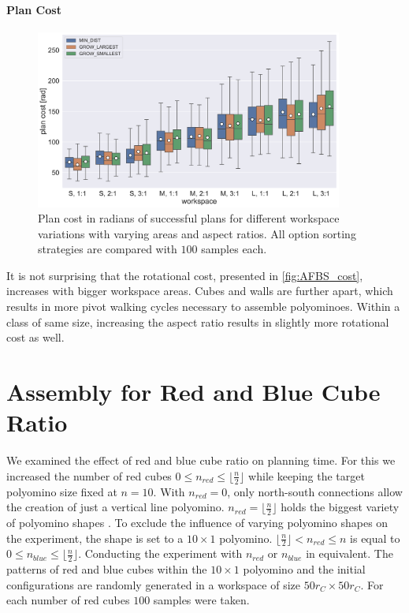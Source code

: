 \paragraph{Plan Cost} 

\begin{figure}
	\centering
	\includegraphics[width=0.9\textwidth]{figures/plots/AFBS_cost.pdf}
	\caption[Plan cost for different workspace variations]{Plan cost in radians of successful plans for different workspace variations with varying areas and aspect ratios. All option sorting strategies are compared with $100$ samples each.}
	\label{fig:AFBS_cost}
\end{figure}

It is not surprising that the rotational cost, presented in \autoref{fig:AFBS_cost}, increases with bigger workspace areas.
Cubes and walls are further apart, which results in more pivot walking cycles necessary to assemble polyominoes.
Within a class of same size, increasing the aspect ratio results in slightly more rotational cost as well.



\section{Assembly for Red and Blue Cube Ratio}
\label{sec:AFNR}

We examined the effect of red and blue cube ratio on planning time.
For this we increased the number of red cubes $0 \leq n_\textit{red} \leq \lfloor \frac{n}{2}\rfloor$ while keeping the target polyomino size fixed at $n = 10$.
With $n_\textit{red} = 0$, only north-south connections allow the creation of just a vertical line polyomino.
$n_\textit{red} = \lfloor \frac{n}{2}\rfloor$ holds the biggest variety of polyomino shapes \cite{Lu2021}.
To exclude the influence of varying polyomino shapes on the experiment, the shape is set to a $10 \times 1$ polyomino.
$\lfloor \frac{n}{2}\rfloor < n_\textit{red} \leq n$ is equal to $0 \leq n_\textit{blue} \leq \lfloor \frac{n}{2}\rfloor$.
Conducting the experiment with $n_\textit{red}$ or $n_\textit{blue}$ in equivalent.
The patterns of red and blue cubes within the $10 \times 1$ polyomino and the initial configurations are randomly generated in a workspace of size $50 r_C \times 50 r_C$.
For each number of red cubes $100$ samples were taken.

